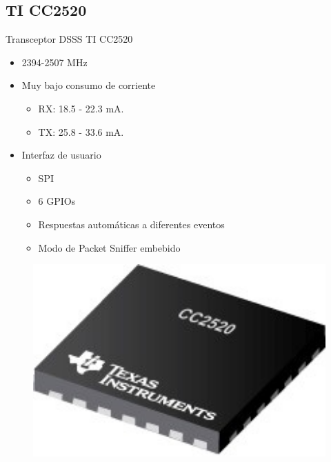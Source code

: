 \documentclass[aspectratio=169]{beamer}
\begin{document}
\subsection[TI CC2520]{TI CC2520}
\begin{frame}{Transceptor DSSS TI CC2520} 
\begin{minipage}[c]{1.0\linewidth}
	\begin{minipage}[c]{0.7\linewidth}
		\begin{itemize}
			\vspace{5px}
			\item 2394-2507 MHz	
			\vspace{10px}
			\item Muy bajo consumo de corriente
			\begin{itemize}
				\item RX: 18.5 - 22.3 mA.
				\item TX: 25.8 - 33.6 mA.
			\end{itemize}
			\vspace{10px}
			\item Interfaz de usuario
			\begin{itemize}
				\item SPI
				\item 6 GPIOs
				\item Respuestas automáticas a diferentes eventos
				\item Modo de Packet Sniffer embebido
			\end{itemize}
			\vspace{10px}
		\end{itemize}
	\end{minipage}
	\begin{minipage}[c]{0.25\linewidth}
		\begin{figure}[H]
			\includegraphics[width=1\textwidth]{./imagenes/cc2520.jpg}
			\label{cc2520}
		\end{figure}	  	  	
	\end{minipage}
\end{minipage}
\end{frame}
\end{document}
